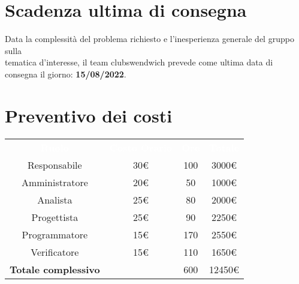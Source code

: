 \section{Scadenza ultima di consegna}
Data la complessità del problema richiesto e l'inesperienza generale del gruppo sulla \\
tematica d'interesse, il team clubswendwich prevede come ultima data di consegna 
il giorno: \textbf{15/08/2022}.

\section{Preventivo dei costi}
{\renewcommand{\arraystretch}{1.5}
\begin{tabular}{cccc}
	\rowcolor[RGB]{33, 73, 50}
	\textcolor{white}{\textbf{Ruolo}} & \textcolor{white}{\textbf{Costo Orario}} 
    & \textcolor{white}{\textbf{Ore}} & \textcolor{white}{\textbf{Totale}}\\
	\rowcolor[RGB]{216, 235, 171}
	Responsabile & 30€ & 100 & 3000€     			\\
	\rowcolor[RGB]{233, 245, 206}
	Amministratore & 20€ & 50 & 1000€    			\\
    \rowcolor[RGB]{216, 235, 171}
	Analista & 25€ & 80 & 2000€          			\\
	\rowcolor[RGB]{233, 245, 206}
	Progettista & 25€ & 90 & 2250€       			\\
    \rowcolor[RGB]{216, 235, 171}
	Programmatore & 15€ & 170 & 2550€     			\\
	\rowcolor[RGB]{233, 245, 206}
	Verificatore & 15€ & 110 & 1650€      			\\
	\rowcolor[RGB]{216, 235, 171}
	\textbf{Totale complessivo} & & 600 & 12450€    \\
\end{tabular}	
}

